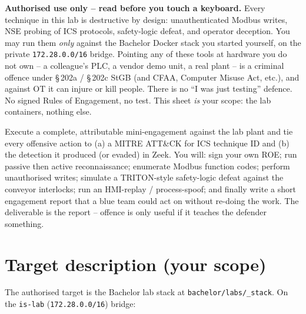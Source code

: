 \documentclass[11pt,a4paper]{article}
\begin{document}
\labheader

\begin{warnbox}
\textbf{Authorised use only -- read before you touch a keyboard.}
Every technique in this lab is destructive by design: unauthenticated
Modbus writes, NSE probing of ICS protocols, safety-logic defeat, and
operator deception. You may run them \emph{only} against the Bachelor
Docker stack you started yourself, on the private
\texttt{172.28.0.0/16} bridge. Pointing any of these tools at hardware
you do not own -- a colleague's PLC, a vendor demo unit, a real plant --
is a criminal offence under \S\,202a / \S\,202c StGB (and CFAA, Computer
Misuse Act, etc.), and against OT it can injure or kill people. There
is no ``I was just testing'' defence. No signed Rules of Engagement,
no test. This sheet \emph{is} your scope: the lab containers, nothing
else.
\end{warnbox}

\begin{goalbox}
Execute a complete, attributable mini-engagement against the lab plant
and tie every offensive action to (a) a MITRE ATT\&CK for ICS technique
ID and (b) the detection it produced (or evaded) in Zeek. You will:
sign your own ROE; run passive then active reconnaissance; enumerate
Modbus function codes; perform unauthorised writes; simulate a
TRITON-style safety-logic defeat against the conveyor interlocks; run
an HMI-replay / process-spoof; and finally write a short engagement
report that a blue team could act on without re-doing the work. The
deliverable is the report -- offence is only useful if it teaches the
defender something.
\end{goalbox}

\section*{Target description (your scope)}

The authorised target is the Bachelor lab stack at
\texttt{bachelor/labs/\_stack}. On the \texttt{is-lab}
(\texttt{172.28.0.0/16}) bridge:
\end{document}

